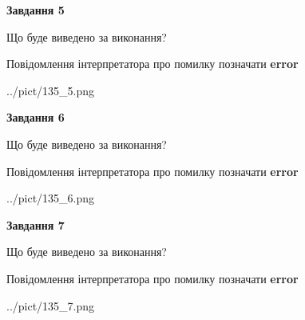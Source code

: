 \documentclass[10pt, ukrainian]{article}
\begin{document}
{\begin {large}
{\begin {center}\textbf{Завдання 5}\end {center}}\par
Що буде виведено за виконання? \par
Повідомлення інтерпретатора про помилку позначати \textbf{error}

\begin{center}
	{../pict/135_5.png}
\end{center}
\newpage

{\begin {center}\textbf{Завдання 6}\end {center}}\par
Що буде виведено за виконання? \par
Повідомлення інтерпретатора про помилку позначати \textbf{error}

\begin{center}
	{../pict/135_6.png}
\end{center}
\newpage

{\begin {center}\textbf{Завдання 7}\end {center}}\par
Що буде виведено за виконання? \par
Повідомлення інтерпретатора про помилку позначати \textbf{error}

\begin{center}
	{../pict/135_7.png}
\end{center}
\newpage

\end {large}}
\end{document}
